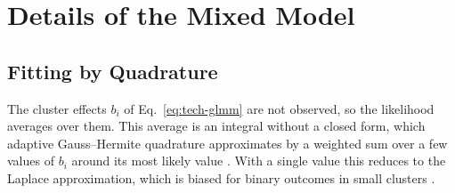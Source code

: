 \chapter{Details of the Mixed Model}
\label{app:glmm}

\section{Fitting by Quadrature}
\label{app:glmm-fitting}

The cluster effects $b_i$ of Eq.~\eqref{eq:tech-glmm} are not observed, so the likelihood averages over them.
This average is an integral without a closed form, which adaptive Gauss--Hermite quadrature approximates by a weighted sum over a few values of $b_i$ around its most likely value \cite{liu1994gausshermite, pinheiro1995approximations}.
With a single value this reduces to the Laplace approximation, which is biased for binary outcomes in small clusters \cite{joe2008laplace, statacorp2025mecloglog}.

